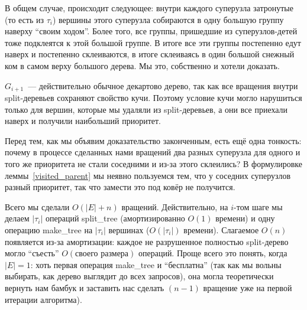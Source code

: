 В общем случае, происходит следующее: внутри каждого суперузла затронутые (то есть из $\tau_i$) вершины этого суперузла собираются в одну большую группу наверху ``своим ходом''. Более того, все группы, пришедшие из суперузлов-детей тоже подклеятся к этой большой группе. В итоге все эти группы постепенно едут наверх и постепенно склеиваются, в итоге склеиваясь в один большой снежный ком в самом верху большого дерева. Мы это, собственно и хотели доказать. 

$G_{i+1}$~--- действительно обычное декартово дерево, так как все вращения внутри split-деревьев сохраняют свойство кучи. Поэтому условие кучи могло нарушиться только для вершин, которые мы удаляли из split-деревьев, а они все 	приехали наверх и получили наибольший приоритет.

Перед тем, как мы объявим доказательство законченным, есть ещё одна тонкость:
почему в процессе сделанных нами вращений два разных суперузла для одного и того же приоритета не стали соседними и из-за этого склеились? В формулировке леммы~\ref{visited_parent} мы неявно пользуемся тем, что у соседних суперузлов разный приоритет, так что замести это под ковёр не получится.

Всего мы сделали $O(|E| + n)$ вращений. Действительно, на $i$-том шаге мы делаем $|\tau_i|$ операций \textrm{split\_tree} (амортизированно $O(1)$ времени) и одну операцию \textrm{make\_tree} на $|\tau_i|$ вершинах ($O(|\tau_i|)$ времени). Слагаемое $O(n)$ появляется из-за амортизации: каждое не разрушенное полностью split-дерево могло ``съесть'' $O(\texttt{своего размера})$ операций. Проще всего это понять, когда $|E| = 1$: хоть первая операция \textrm{make\_tree}  и ``бесплатна'' (так как мы вольны выбирать, как дерево выглядит до всех запросов), она могла теоретически вернуть нам бамбук и заставить нас сделать $(n-1)$ вращение уже на первой итерации алгоритма).

